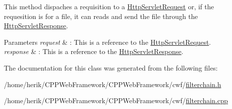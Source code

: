 This method dispaches a requisition to a \hyperlink{class_http_servlet_request}{Http\+Servlet\+Request} or, if the requesition is for a file, it can reads and send the file through the \hyperlink{class_http_servlet_response}{Http\+Servlet\+Response}. 


\begin{DoxyParams}{Parameters}
{\em request} & \+: This is a reference to the \hyperlink{class_http_servlet_request}{Http\+Servlet\+Request}. \\
\hline
{\em response} & \+: This is a reference to the \hyperlink{class_http_servlet_response}{Http\+Servlet\+Response}. \\
\hline
\end{DoxyParams}


The documentation for this class was generated from the following files\+:\begin{DoxyCompactItemize}
\item 
/home/herik/\+C\+P\+P\+Web\+Framework/\+C\+P\+P\+Web\+Framework/cwf/\hyperlink{filterchain_8h}{filterchain.\+h}\item 
/home/herik/\+C\+P\+P\+Web\+Framework/\+C\+P\+P\+Web\+Framework/cwf/\hyperlink{filterchain_8cpp}{filterchain.\+cpp}\end{DoxyCompactItemize}
